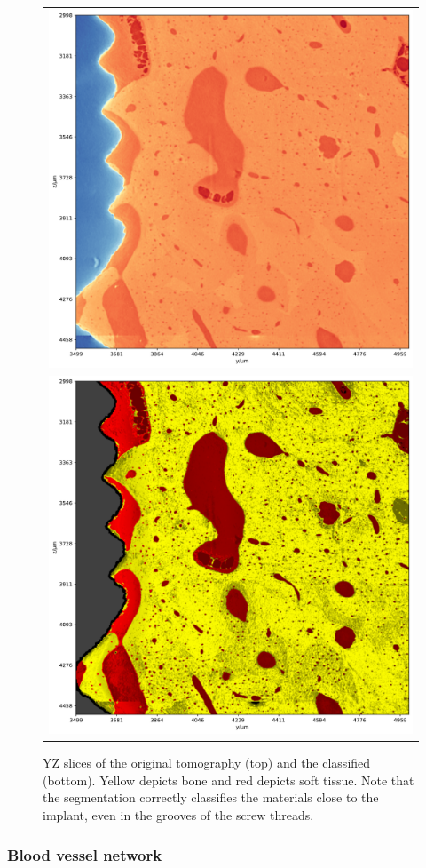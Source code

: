 \begin{figure}
    \centering
    \begin{tabular}{c}
        \includegraphics[width=.7\linewidth]{generated/770c_pag_segmented_zy_raw.pdf} \\
        \includegraphics[width=.7\linewidth]{generated/770c_pag_segmented_zy_colored.pdf}
    \end{tabular}
    \caption{
        YZ slices of the original tomography (top) and the classified (bottom).
        Yellow depicts bone and red depicts soft tissue. Note that the
        segmentation correctly classifies the materials close to the implant,
        even in the grooves of the screw threads.
    }
    \label{fig:histology-comparison2}
\end{figure}

\subsubsection{Blood vessel network}
\label{sec:blood-network}

